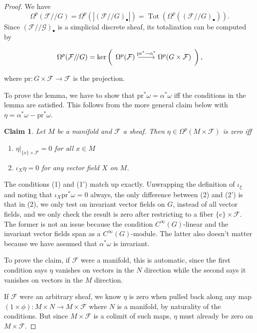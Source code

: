 \documentclass{shortart}
\newtheorem*{claim}{Claim}
\theoremstyle{definition}
\DeclareMathOperator\Tot{Tot}
\newcommand\pr{\mathrm{pr}}
\newcommand\modmod{/\!/}
\begin{document}
\begin{proof}
  We have
  \[
    \Omega^p (\mathcal{F} \modmod G) = \Omega^p(|(\mathcal{F}\modmod G)_\bullet|) = \Tot(\Omega^p((\mathcal{F}\modmod G)_\bullet)).
  \]
  Since $(\mathcal{F}\modmod \mathcal{G})_\bullet$ is a simplicial discrete sheaf, its totalization can be computed by
  \begin{useimager}
    \[
      \Omega^p(\mathcal{F}\modmod G) = \ker \left(\begin{tikzcd}\Omega^p(\mathcal{F}) \ar[r, "\pr^* - \alpha^*"] & \Omega^p(G \times \mathcal{F})\end{tikzcd}\right),
    \]
  \end{useimager}%
  where $\pr: G \times \mathcal{F} \to \mathcal{F}$ is the projection.

  To prove the lemma, we have to show that $\pr^* \omega = \alpha^* \omega$ iff the conditions in the lemma are satisfied. This follows from the more general claim below with $\eta = \alpha^* \omega - \pr^* \omega$.
  \begin{claim}
    Let $M$ be a manifold and $\mathcal{F}$ a sheaf. Then $\eta \in \Omega^p(M \times \mathcal{F})$ is zero iff
    \begin{enumerate}
      \item[(1)] $\eta|_{\{x\} \times \mathcal{F}} = 0$ for all $x \in M$
      \item[(2)] $\iota_X \eta = 0$ for any vector field $X$ on $M$.
    \end{enumerate}
  \end{claim}

  The conditions (1) and (1') match up exactly. Unwrapping the definition of $\iota_\xi$ and noting that $\iota_X \pr^* \omega = 0$ always, the only difference between (2) and (2') is that in (2), we only test on invariant vector fields on $G$, instead of all vector fields, and we only check the result is zero after restricting to a fiber $\{e\} \times \mathcal{F}$. The former is not an issue because the condition $C^\infty(G)$-linear and the invariant vector fields span as a $C^\infty(G)$-module. The latter also doesn't matter because we have assumed that $\alpha^* \omega$ is invariant. 

  To prove the claim, if $\mathcal{F}$ were a manifold, this is automatic, since the first condition says $\eta$ vanishes on vectors in the $N$ direction while the second says it vanishes on vectors in the $M$ direction.

  If $\mathcal{F}$ were an arbitrary sheaf, we know $\eta$ is zero when pulled back along any map $(1 \times \phi): M \times N \to M \times \mathcal{F}$ where $N$ is a manifold, by naturality of the conditions. But since $M \times \mathcal{F}$ is a colimit of such maps, $\eta$ must already be zero on $M \times \mathcal{F}$.
\end{proof}
\end{document}
